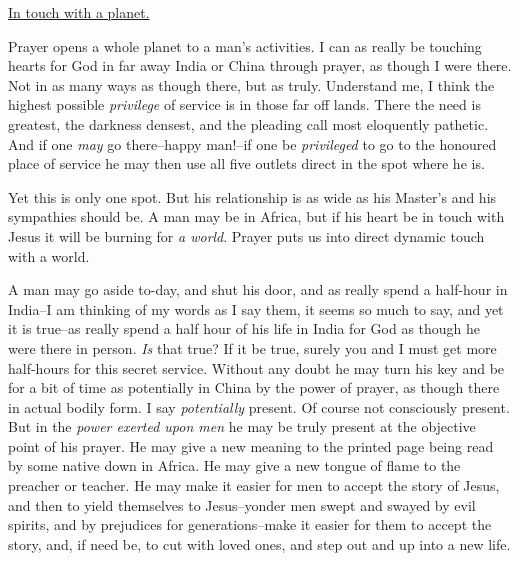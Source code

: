 \underline{In touch with a planet.}


Prayer opens a whole planet to a man's activities. I can as really be
touching hearts for God in far away India or China through prayer, as
though I were there. Not in as many ways as though there, but as truly.
Understand me, I think the highest possible \textit{privilege} of service is in
those far off lands. There the need is greatest, the darkness densest, and
the pleading call most eloquently pathetic. And if one \textit{may} go
there--happy man!--if one be \textit{privileged} to go to the honoured place of
service he may then use all five outlets direct in the spot where he is.

Yet this is only one spot. But his relationship is as wide as his Master's
and his sympathies should be. A man may be in Africa, but if his heart be
in touch with Jesus it will be burning for \textit{a world}. Prayer puts us into
direct dynamic touch with a world.

A man may go aside to-day, and shut his door, and as really spend a
half-hour in India--I am thinking of my words as I say them, it seems so
much to say, and yet it is true--as really spend a half hour of his life
in India for God as though he were there in person. \textit{Is} that true? If it
be true, surely you and I must get more half-hours for this secret
service. Without any doubt he may turn his key and be for a bit of time as
potentially in China by the power of prayer, as though there in actual
bodily form. I say \textit{potentially} present. Of course not consciously
present. But in the \textit{power exerted upon men} he may be truly present at
the objective point of his prayer. He may give a new meaning to the
printed page being read by some native down in Africa. He may give a new
tongue of flame to the preacher or teacher. He may make it easier for men
to accept the story of Jesus, and then to yield themselves to
Jesus--yonder men swept and swayed by evil spirits, and by prejudices for
generations--make it easier for them to accept the story, and, if need be,
to cut with loved ones, and step out and up into a new life.

